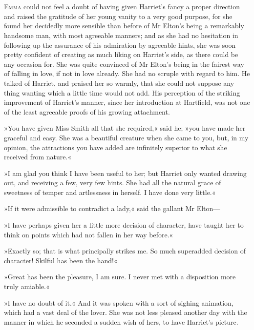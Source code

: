 \chapter[Chapter \thechapter]{}
\lettrine[lines=4,lraise=0.3]{E}{mma} could not feel a doubt of having given Harriet's fancy a proper direction and raised the gratitude of her young vanity to a very good purpose, for she found her decidedly more sensible than before of Mr Elton's being a remarkably handsome man, with most agreeable manners; and as she had no hesitation in following up the assurance of his admiration by agreeable hints, she was soon pretty confident of creating as much liking on Harriet's side, as there could be any occasion for. She was quite convinced of Mr Elton's being in the fairest way of falling in love, if not in love already. She had no scruple with regard to him. He talked of Harriet, and praised her so warmly, that she could not suppose any thing wanting which a little time would not add. His perception of the striking improvement of Harriet's manner, since her introduction at Hartfield, was not one of the least agreeable proofs of his growing attachment.

»You have given Miss Smith all that she required,« said he; »you have made her graceful and easy. She was a beautiful creature when she came to you, but, in my opinion, the attractions you have added are infinitely superior to what she received from nature.«

»I am glad you think I have been useful to her; but Harriet only wanted drawing out, and receiving a few, very few hints. She had all the natural grace of sweetness of temper and artlessness in herself. I have done very little.«

»If it were admissible to contradict a lady,« said the gallant Mr Elton—

»I have perhaps given her a little more decision of character, have taught her to think on points which had not fallen in her way before.«

»Exactly so; that is what principally strikes me. So much superadded decision of character! Skilful has been the hand!«

»Great has been the pleasure, I am sure. I never met with a disposition more truly amiable.«

»I have no doubt of it.« And it was spoken with a sort of sighing animation, which had a vast deal of the lover. She was not less pleased another day with the manner in which he seconded a sudden wish of hers, to have Harriet's picture.

